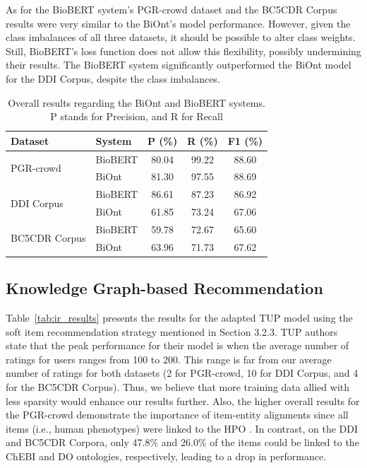 As for the BioBERT system's PGR-crowd dataset and the BC5CDR Corpus results were very similar to the BiOnt's model performance. However, given the class imbalances of all three datasets, it should be possible to alter class weights. Still, BioBERT's loss function does not allow this flexibility, possibly undermining their results. The BioBERT system significantly outperformed the BiOnt model for the DDI Corpus, despite the class imbalances. 

\begin{table}[h]
\centering
  \caption[Results for Relation Extraction using BiOnt and BioBERT Systems]{Overall results regarding the BiOnt and BioBERT systems. P stands for Precision, and R for Recall}
  \label{tab:biont_results}
  \begin{tabular}{llccc}
    \hline
    Dataset & System & P (\%) & R (\%) & F1 (\%) \\
    \hline
    \multirow{2}{*}{PGR-crowd} & BioBERT & 80.04 & 99.22 & 88.60 \\
    & BiOnt & 81.30 & 97.55 & 88.69  \\
    \hline
    \multirow{2}{*}{DDI Corpus} & BioBERT & 86.61 & 87.23 & 86.92 \\
    & BiOnt & 61.85 & 73.24 & 67.06 \\
    \hline
    \multirow{2}{*}{BC5CDR Corpus} & BioBERT & 59.78 & 72.67 & 65.60 \\
    & BiOnt & 63.96 & 71.73 & 67.62 \\
    \hline
  \end{tabular}
\end{table}


\subsection{Knowledge Graph-based Recommendation}

Table~\ref{tab:ir_results} presents the results for the adapted TUP model using the soft item recommendation strategy mentioned in Section 3.2.3. TUP authors \citep{10.1145/3308558.3313705} state that the peak performance for their model is when the average number of ratings for users ranges from 100 to 200. This range is far from our average number of ratings for both datasets (2 for PGR-crowd, 10 for DDI Corpus, and 4 for the BC5CDR Corpus). Thus, we believe that more training data allied with less sparsity would enhance our results further. Also, the higher overall results for the PGR-crowd demonstrate the importance of item-entity alignments since all items (i.e., human phenotypes) were linked to the HPO \citep{kohler2019expansion}. In contrast, on the DDI and BC5CDR Corpora, only 47.8\% and 26.0\% of the items could be linked to the ChEBI \citep{herrero2013ddi} and DO \citep{schriml2012disease} ontologies, respectively, leading to a drop in performance.  

